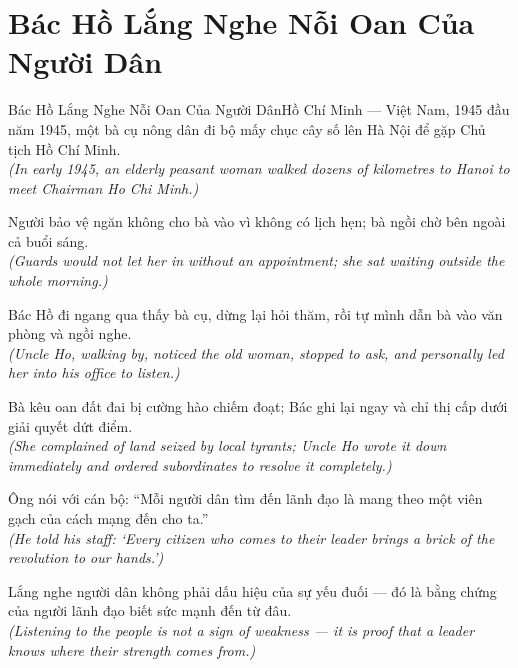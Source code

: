 \section{Bác Hồ Lắng Nghe Nỗi Oan Của Người Dân}
\begin{truyen}{Bác Hồ Lắng Nghe Nỗi Oan Của Người Dân}{Hồ Chí Minh --- Việt Nam, 1945}
 đầu năm 1945, một bà cụ nông dân đi bộ mấy chục cây số lên Hà Nội để gặp Chủ tịch Hồ Chí Minh.\\[4pt]
\textit{(In early 1945, an elderly peasant woman walked dozens of kilometres to Hanoi to meet Chairman Ho Chi Minh.)}

Người bảo vệ ngăn không cho bà vào vì không có lịch hẹn; bà ngồi chờ bên ngoài cả buổi sáng.\\[4pt]
\textit{(Guards would not let her in without an appointment; she sat waiting outside the whole morning.)}

Bác Hồ đi ngang qua thấy bà cụ, dừng lại hỏi thăm, rồi tự mình dẫn bà vào văn phòng và ngồi nghe.\\[4pt]
\textit{(Uncle Ho, walking by, noticed the old woman, stopped to ask, and personally led her into his office to listen.)}

Bà kêu oan đất đai bị cường hào chiếm đoạt; Bác ghi lại ngay và chỉ thị cấp dưới giải quyết dứt điểm.\\[4pt]
\textit{(She complained of land seized by local tyrants; Uncle Ho wrote it down immediately and ordered subordinates to resolve it completely.)}

Ông nói với cán bộ: ``Mỗi người dân tìm đến lãnh đạo là mang theo một viên gạch của cách mạng đến cho ta.''\\[4pt]
\textit{(He told his staff: `Every citizen who comes to their leader brings a brick of the revolution to our hands.')}

\end{truyen}
\begin{baihoc}
  Lắng nghe người dân không phải dấu hiệu của sự yếu đuối --- đó là bằng chứng của người lãnh đạo biết sức mạnh đến từ đâu.\\[4pt]
  \textit{(Listening to the people is not a sign of weakness --- it is proof that a leader knows where their strength comes from.)}
\end{baihoc}

